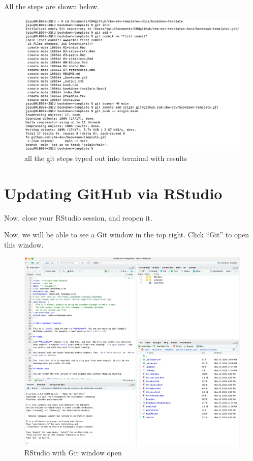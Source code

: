 \documentclass[
]{book}
\theoremstyle{definition}
\theoremstyle{definition}
\theoremstyle{definition}
\theoremstyle{definition}
\theoremstyle{remark}
\begin{document}
All the steps are shown below.

\begin{figure}
\centering
\includegraphics{img/git-instruct/git-instructions-in-terminal.png}
\caption{all the git steps typed out into terminal with results}
\end{figure}

\section{Updating GitHub via RStudio}\label{updating-github-via-rstudio}

Now, close your RStudio session, and reopen it.

Now, we will be able to see a Git window in the top right. Click ``Git'' to open this window.

\begin{figure}
\centering
\includegraphics{img/git-instruct/RStudio-with-git-window-open.png}
\caption{RStudio with Git window open}
\end{figure}
\end{document}
